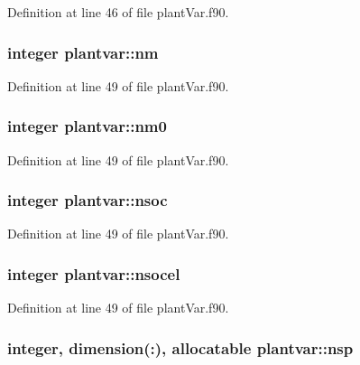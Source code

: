 Definition at line 46 of file plant\-Var.\-f90.

\hypertarget{classplantvar_a137041d7f1c30cc7d248b9ada4feab69}{
\subsubsection[{nm}]{\setlength{\rightskip}{0pt plus 5cm}integer plantvar\-::nm}}\label{classplantvar_a137041d7f1c30cc7d248b9ada4feab69}


Definition at line 49 of file plant\-Var.\-f90.

\hypertarget{classplantvar_a56d8f60e631d2b0dc2d7a0252a49e80e}{
\subsubsection[{nm0}]{\setlength{\rightskip}{0pt plus 5cm}integer plantvar\-::nm0}}\label{classplantvar_a56d8f60e631d2b0dc2d7a0252a49e80e}


Definition at line 49 of file plant\-Var.\-f90.

\hypertarget{classplantvar_ac56a3422e256b7cdcc55623af8ba6c7b}{
\subsubsection[{nsoc}]{\setlength{\rightskip}{0pt plus 5cm}integer plantvar\-::nsoc}}\label{classplantvar_ac56a3422e256b7cdcc55623af8ba6c7b}


Definition at line 49 of file plant\-Var.\-f90.

\hypertarget{classplantvar_a56078fb4f499089dd81db61a9e8dfc0f}{
\subsubsection[{nsocel}]{\setlength{\rightskip}{0pt plus 5cm}integer plantvar\-::nsocel}}\label{classplantvar_a56078fb4f499089dd81db61a9e8dfc0f}


Definition at line 49 of file plant\-Var.\-f90.

\hypertarget{classplantvar_a16e98f1a836d4de3e5436365e77441b0}{
\subsubsection[{nsp}]{\setlength{\rightskip}{0pt plus 5cm}integer, dimension(\-:), allocatable plantvar\-::nsp}}\label{classplantvar_a16e98f1a836d4de3e5436365e77441b0}


